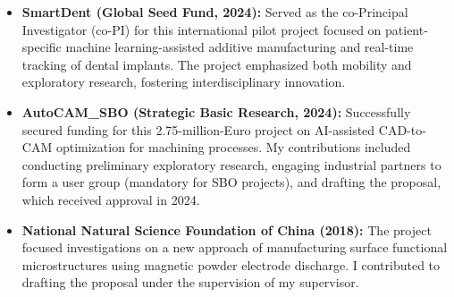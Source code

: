 \documentclass[9pt,a4paper]{article}
\begin{document}
\begin{itemize}
    \item \textbf{SmartDent (Global Seed Fund, 2024):}  
    Served as the co-Principal Investigator (co-PI) for this international pilot project focused on patient-specific machine learning-assisted additive manufacturing and real-time tracking of dental implants. The project emphasized both mobility and exploratory research, fostering interdisciplinary innovation.

    \item \textbf{AutoCAM\_SBO (Strategic Basic Research, 2024):}  
    Successfully secured funding for this 2.75-million-Euro project on AI-assisted CAD-to-CAM optimization for machining processes. My contributions included conducting preliminary exploratory research, engaging industrial partners to form a user group (mandatory for SBO projects), and drafting the proposal, which received approval in 2024.

    \item \textbf{National Natural Science Foundation of China (2018):}  
    The project focused investigations on a new approach of manufacturing surface functional microstructures using magnetic powder electrode discharge. 
    I contributed to drafting the proposal under the supervision of my supervisor. 
\end{itemize}

\clearpage
\end{document}
